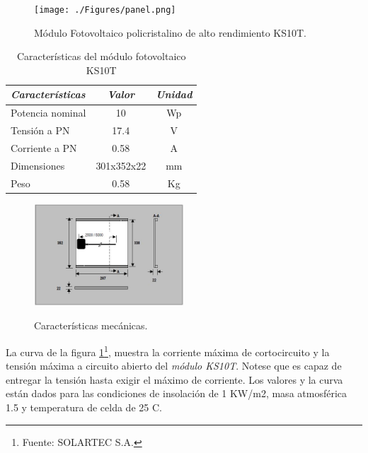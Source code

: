  \begin{figure}[h!]
	\centering
    \texttt{[image: ./Figures/panel.png]}
	\label{fig:ks10t}
	\caption{Módulo Fotovoltaico policristalino de alto rendimiento KS10T.}
\end{figure}

\vspace{10px}

\begin{table}[ht]
	\centering
	\caption{Características del módulo fotovoltaico KS10T}
	\begin{tabular}{@{} l *2c @{}}    \toprule
		\emph{\textbf{Características}} & \emph{\textbf{Valor}} & \emph{\textbf{Unidad}}\\
		\midrule
		Potencia nominal	& 10 	& Wp	\\	
		Tensión a PN		& 17.4	& V\\
		Corriente a PN	& 0.58		& A\\
		Dimensiones		& 301x352x22 	& mm\\
		Peso				& 0.58		& Kg	\\
		\bottomrule
		\hline
	\end{tabular}
	\label{tab:ks10t}
\end{table}

\begin{figure}[h!]
	\centering
    \includegraphics[width=0.5\textwidth]{./Figures/mecanicas.JPG}
	\label{fig:mecanicas}
	\caption{Características mecánicas.}
\end{figure}


La curva de la figura \ref{fig:ks10t}\footnote{Fuente: SOLARTEC S.A.}, muestra la corriente máxima de cortocircuito y la tensión máxima a circuito abierto del \textit{módulo KS10T}. Notese que es capaz de entregar la tensión hasta exigir el máximo de corriente. Los valores y la curva están dados para las condiciones de insolación de 1 KW/m2, masa atmosférica 1.5 y temperatura de celda de 25 \grados C.

